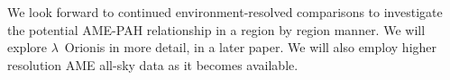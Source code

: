 \documentclass[preprint2,longabstract]{aastex}
\begin{document}
           We look forward to continued environment-resolved comparisons to investigate the potential AME-PAH relationship in a region by region manner. We will explore $\lambda$~Orionis in more detail, in a later paper. We will also employ higher resolution AME all-sky data as it becomes available.



\end{document}
